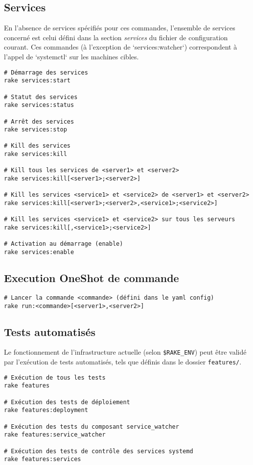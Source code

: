 \documentclass[a4paper,oneside,10pt]{article}
\begin{document}
\subsection{Services}

En l'absence de services spécifiés pour ces commandes, l'ensemble de services
concerné est celui défini dans la section \textit{services} du fichier de configuration
courant. Ces commandes (à l'exception de `services:watcher`) correspondent
à l'appel de `systemctl` sur les machines cibles.

\begin{verbatim}
# Démarrage des services
rake services:start

# Statut des services
rake services:status

# Arrêt des services
rake services:stop

# Kill des services
rake services:kill

# Kill tous les services de <server1> et <server2>
rake services:kill[<server1>;<server2>]

# Kill les services <service1> et <service2> de <server1> et <server2>
rake services:kill[<server1>;<server2>,<service1>;<service2>]

# Kill les services <service1> et <service2> sur tous les serveurs
rake services:kill[,<service1>;<service2>]

# Activation au démarrage (enable)
rake services:enable
\end{verbatim}

\subsection{Execution OneShot de commande}

\begin{verbatim}
# Lancer la commande <commande> (défini dans le yaml config)
rake run:<commande>[<server1>,<server2>]
\end{verbatim}


\subsection{Tests automatisés}

Le fonctionnement de l'infrastructure actuelle (selon \verb!$RAKE_ENV!) peut être
validé par l'exécution de tests automatisés, tels que définis dans le dossier
\verb!features/!.

\begin{verbatim}
# Exécution de tous les tests
rake features

# Exécution des tests de déploiement
rake features:deployment

# Exécution des tests du composant service_watcher
rake features:service_watcher

# Exécution des tests de contrôle des services systemd
rake features:services
\end{verbatim}
\end{document}
